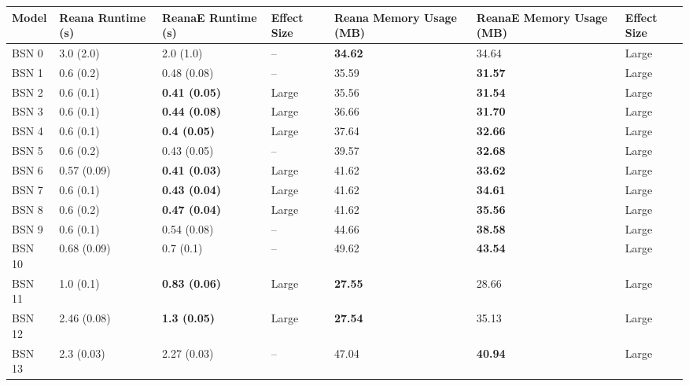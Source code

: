 \begin{tabular}{lllllll}
\toprule
 Model &     Reana Runtime (s) &    ReanaE Runtime (s) & Effect Size & Reana Memory Usage (MB) & ReanaE Memory Usage (MB) & Effect Size \\
\midrule
 BSN 0 &             3.0 (2.0) &             2.0 (1.0) &          -- &          \textbf{34.62} &                    34.64 &       Large \\
 BSN 1 &             0.6 (0.2) &           0.48 (0.08) &          -- &                   35.59 &           \textbf{31.57} &       Large \\
 BSN 2 &             0.6 (0.1) &  \textbf{0.41 (0.05)} &       Large &                   35.56 &           \textbf{31.54} &       Large \\
 BSN 3 &             0.6 (0.1) &  \textbf{0.44 (0.08)} &       Large &                   36.66 &           \textbf{31.70} &       Large \\
 BSN 4 &             0.6 (0.1) &   \textbf{0.4 (0.05)} &       Large &                   37.64 &           \textbf{32.66} &       Large \\
 BSN 5 &             0.6 (0.2) &           0.43 (0.05) &          -- &                   39.57 &           \textbf{32.68} &       Large \\
 BSN 6 &           0.57 (0.09) &  \textbf{0.41 (0.03)} &       Large &                   41.62 &           \textbf{33.62} &       Large \\
 BSN 7 &             0.6 (0.1) &  \textbf{0.43 (0.04)} &       Large &                   41.62 &           \textbf{34.61} &       Large \\
 BSN 8 &             0.6 (0.2) &  \textbf{0.47 (0.04)} &       Large &                   41.62 &           \textbf{35.56} &       Large \\
 BSN 9 &             0.6 (0.1) &           0.54 (0.08) &          -- &                   44.66 &           \textbf{38.58} &       Large \\
BSN 10 &           0.68 (0.09) &             0.7 (0.1) &          -- &                   49.62 &           \textbf{43.54} &       Large \\
BSN 11 &             1.0 (0.1) &  \textbf{0.83 (0.06)} &       Large &          \textbf{27.55} &                    28.66 &       Large \\
BSN 12 &           2.46 (0.08) &   \textbf{1.3 (0.05)} &       Large &          \textbf{27.54} &                    35.13 &       Large \\
BSN 13 &            2.3 (0.03) &           2.27 (0.03) &          -- &                   47.04 &           \textbf{40.94} &       Large \\

\end{tabular}
